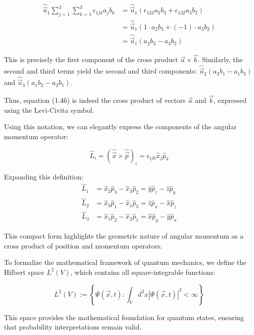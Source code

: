 \documentclass[10pt]{article}
\begin{document}
\begin{align*}
\hat{\vec{u}}_{1} \sum_{j=1}^{3} \sum_{k=1}^{3} \epsilon_{1 j k} a_{j} b_{k} &= \hat{\vec{u}}_{1}(\epsilon_{123} a_{2} b_{3} + \epsilon_{132} a_{3} b_{2}) \tag{1.48} \\
&= \hat{\vec{u}}_{1}(1 \cdot a_{2} b_{3} + (-1) \cdot a_{3} b_{2}) \\
&= \hat{\vec{u}}_{1}(a_{2} b_{3} - a_{3} b_{2})
\end{align*}

This is precisely the first component of the cross product $\vec{a} \times \vec{b}$. Similarly, the second and third terms yield the second and third components:
$\hat{\vec{u}}_{2}(a_{3} b_{1} - a_{1} b_{3})$ and $\hat{\vec{u}}_{3}(a_{1} b_{2} - a_{2} b_{1})$.

Thus, equation (1.46) is indeed the cross product of vectors $\vec{a}$ and $\vec{b}$, expressed using the Levi-Civita symbol.

Using this notation, we can elegantly express the components of the angular momentum operator:

\begin{equation*}
\hat{L}_{i} = (\hat{\vec{x}} \times \hat{\vec{p}})_{i} = \epsilon_{i j k} \hat{x}_{j} \hat{p}_{k} \tag{1.49}
\end{equation*}

Expanding this definition:
\begin{align*}
\hat{L}_1 &= \hat{x}_2\hat{p}_3 - \hat{x}_3\hat{p}_2 = \hat{y}\hat{p}_z - \hat{z}\hat{p}_y \\
\hat{L}_2 &= \hat{x}_3\hat{p}_1 - \hat{x}_1\hat{p}_3 = \hat{z}\hat{p}_x - \hat{x}\hat{p}_z \\
\hat{L}_3 &= \hat{x}_1\hat{p}_2 - \hat{x}_2\hat{p}_1 = \hat{x}\hat{p}_y - \hat{y}\hat{p}_x
\end{align*}

This compact form highlights the geometric nature of angular momentum as a cross product of position and momentum operators.

To formalize the mathematical framework of quantum mechanics, we define the Hilbert space $L^{2}(V)$, which contains all square-integrable functions:

\begin{equation*}
L^{2}(V) := \left\{\Psi(\vec{x},t) : \int_{V} d^{3}x |\Psi(\vec{x},t)|^{2} < \infty \right\} \tag{1.50}
\end{equation*}

This space provides the mathematical foundation for quantum states, ensuring that probability interpretations remain valid.
\end{document}
